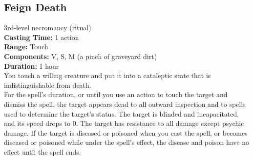 \documentclass[11pt, A4paper, english]{article}
\begin{document}
		\subsection{Feign Death}
3rd-level necromancy (ritual) \\
\textbf{Casting Time:} 1 action \\
\textbf{Range:} Touch \\
\textbf{Components:} V, S, M (a pinch of graveyard dirt) \\
\textbf{Duration:} 1 hour \\
You touch a willing creature and put it into a cataleptic state that is indistinguishable from death. \\
For the spell’s duration, or until you use an action to touch the target and dismiss the spell, the target appears dead to all outward inspection and to spells used to determine the target’s status. The target is blinded and incapacitated, and its speed drops to 0. The target has resistance to all damage except psychic damage. If the target is diseased or poisoned when you cast the spell, or becomes diseased or poisoned while under the spell’s effect, the disease and poison have no effect until the spell ends.
\end{document}
